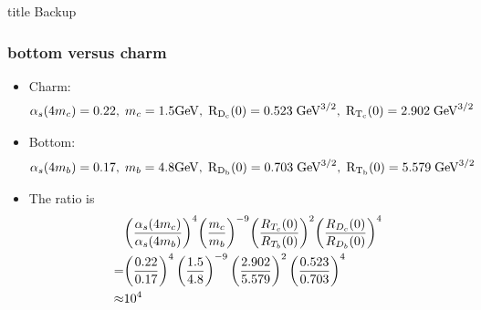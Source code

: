\appendix
\begin{frame}
  \vfill
  \centering
  \begin{beamercolorbox}[sep=8pt,center,shadow=true,rounded=true]{title}
    Backup\par%
  \end{beamercolorbox}
  \vfill
\end{frame}

\begin{frame}
  \frametitle{bottom versus charm}

  \begin{itemize}
    \item Charm:
          \begin{align*}
            \alpha_s(4m_c)=0.22,\; m_c=1.5 \rm{GeV},\; R_{D_c}(0)=0.523\;\mathrm{GeV}^{3/2},\;R_{T_c}(0)=2.902 \;\mathrm{GeV}^{3/2}
          \end{align*}
    \item Bottom:
          \begin{align*}
            \alpha_s(4m_b)=0.17,\; m_b=4.8 \rm{GeV},\; R_{D_b}(0)=0.703\;\mathrm{GeV}^{3/2},\;R_{T_b}(0)=5.579 \;\mathrm{GeV}^{3/2}
          \end{align*}
    \item The ratio is
          \begin{align*}
                    & \pqty{\frac{\alpha_s(4m_c)}{\alpha_s(4m_b)}}^4\pqty{\frac{ m_c}{ m_b}}^{-9}\pqty{\frac{R_{T_c}(0)}{R_{T_b}(0)}}^2\pqty{\frac{R_{D_c}(0)}{R_{D_b}(0)}}^4 \\
            =       & {\left(\frac{0.22}{0.17}\right)^4\left(\frac{1.5}{4.8}\right)^{-9} \left(\frac{2.902}{5.579}\right)^2 \left(\frac{0.523}{0.703}\right)^4}               \\
            \approx & 10^4
          \end{align*}
  \end{itemize}

\end{frame}

\printbibliography

% 
% 


